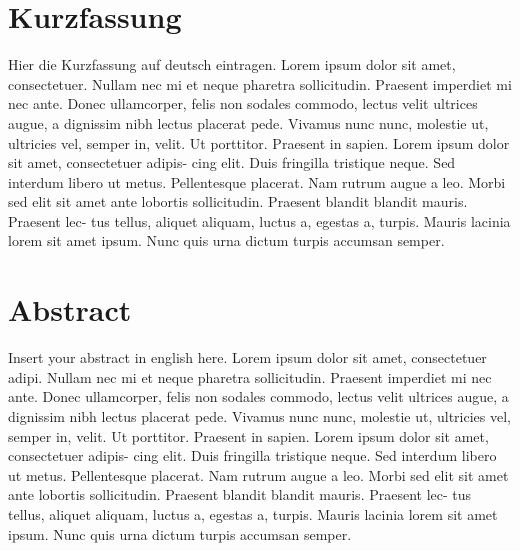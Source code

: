 \section*{Kurzfassung}
Hier die Kurzfassung auf deutsch eintragen. Lorem ipsum dolor sit amet, consectetuer. 
Nullam nec mi et neque pharetra sollicitudin. Praesent imperdiet mi nec ante. Donec 
ullamcorper, felis non sodales commodo, lectus velit ultrices augue, a dignissim nibh 
lectus placerat pede. Vivamus nunc nunc, molestie ut, ultricies vel, semper in, velit. 
Ut porttitor. Praesent in sapien. Lorem ipsum dolor sit amet, consectetuer adipis- 
cing elit. Duis fringilla tristique neque. Sed interdum libero ut metus. Pellentesque 
placerat. Nam rutrum augue a leo. Morbi sed elit sit amet ante lobortis sollicitudin. 
Praesent blandit blandit mauris. Praesent lec- tus tellus, aliquet aliquam, luctus a, 
egestas a, turpis. Mauris lacinia lorem sit amet ipsum. Nunc quis urna dictum turpis 
accumsan semper.

\section*{Abstract}
Insert your abstract in english here. Lorem ipsum dolor sit amet, consectetuer adipi.
Nullam nec mi et neque pharetra sollicitudin. Praesent imperdiet mi nec ante. Donec 
ullamcorper, felis non sodales commodo, lectus velit ultrices augue, a dignissim nibh 
lectus placerat pede. Vivamus nunc nunc, molestie ut, ultricies vel, semper in, velit. 
Ut porttitor. Praesent in sapien. Lorem ipsum dolor sit amet, consectetuer adipis- 
cing elit. Duis fringilla tristique neque. Sed interdum libero ut metus. Pellentesque 
placerat. Nam rutrum augue a leo. Morbi sed elit sit amet ante lobortis sollicitudin. 
Praesent blandit blandit mauris. Praesent lec- tus tellus, aliquet aliquam, luctus a, 
egestas a, turpis. Mauris lacinia lorem sit amet ipsum. Nunc quis urna dictum turpis 
accumsan semper.
